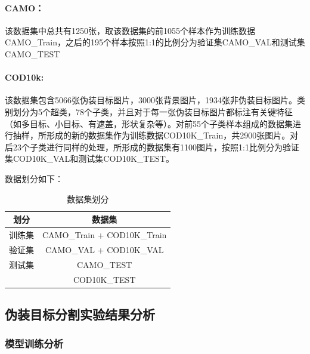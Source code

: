 \documentclass[a4paper,12pt]{ctexart}
\begin{document}
\paragraph{CAMO\cite{Le2019AnabranchNF}：}该数据集中总共有1250张，取该数据集的前1055个样本作为训练数据CAMO\_Train，之后的195个样本按照1:1的比例分为验证集CAMO\_VAL和测试集CAMO\_TEST

\paragraph{COD10k\cite{Fan2020CamouflagedOD}: }该数据集包含5066张伪装目标图片，3000张背景图片，1934张非伪装目标图片。类别划分为5个超类，78个子类，并且对于每一张伪装目标图片都标注有关键特征（如多目标、小目标、有遮盖，形状复杂等）。对前55个子类样本组成的数据集进行抽样，所形成的新的数据集作为训练数据COD10K\_Train，共2900张图片。对后23个子类进行同样的处理，所形成的数据集有1100图片，按照1:1比例分为验证集COD10K\_VAL和测试集COD10K\_TEST。

数据划分如下：
\begin{table}[ht]
    \centering
    \begin{tabular}{|c|c|}
    \hline
    \textbf{划分} & \textbf{数据集} \\
    \hline
    训练集 & CAMO\_Train + COD10K\_Train \\
    \hline
    验证集 & CAMO\_VAL + COD10K\_VAL \\
    \hline
    测试集 & CAMO\_TEST \\
          & COD10K\_TEST \\
    \hline
    \end{tabular}
    \caption{数据集划分}
\end{table}

\subsection{伪装目标分割实验结果分析}
\subsubsection{模型训练分析}
\end{document}
